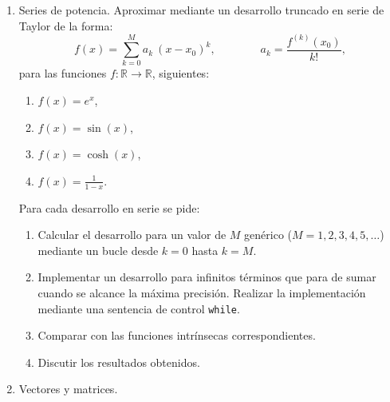 \documentclass[12pt]{article}
\begin{document}
\begin{enumerate}
\item Series de potencia.  
Aproximar  mediante un desarrollo truncado en serie de Taylor de la forma:
\[  f(x) = \sum_{k=0} ^M a_k \  (x-x_0)^k, \qquad \qquad a_k = \frac{  f^{(k)} 
(x_0)  }{ k! },  \]  
para las funciones $f : \mathbb{R} \rightarrow \mathbb{R}$, siguientes:    
\begin{enumerate}
	\item $f(x) = e^x$,     
	\item $f(x) = \sin(x)$,   
	\item $f(x) = \cosh(x)$, 
	\item $f(x) = \displaystyle \frac{1}{1 - x}$.               
\end{enumerate}
Para cada desarrollo en serie se pide:    



\begin{enumerate}
	\item Calcular el desarrollo para un valor de $M$ genérico ($M=1, 2, 3, 4, 5, \hdots$) mediante un bucle desde $ k=0$ 
	hasta $ k = M $. 
	\item Implementar un desarrollo para infinitos términos que para de sumar cuando se alcance la máxima precisión. 
	Realizar la implementación mediante 
	una sentencia de control  \verb|while|.   
	\item Comparar con las funciones intrínsecas correspondientes.     
	\item Discutir los resultados obtenidos.
\end{enumerate}


















\newpage 

\item   Vectores y matrices. 


\end{enumerate}
\end{document}
